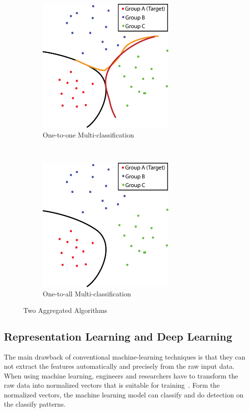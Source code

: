 \begin{spacing}{1.5}
\begin{figure}[th]
    \centering
    \begin{subfigure}[b]{0.49\textwidth}
        \centering
        \includegraphics[width=2.7in, fbox]{Chapter2/1to1.eps}
        \caption{One-to-one Multi-classification}
        \label{fig:121} 
    \end{subfigure}%
    ~
    \begin{subfigure}[b]{0.49\textwidth}
        \centering
        \includegraphics[width=2.7in, fbox]{Chapter2/1toall.eps}
        \caption{One-to-all Multi-classification}
        \label{fig:12all} 
    \end{subfigure}
    \caption{Two Aggregated Algorithms}
\end{figure}


\subsection{Representation Learning and Deep Learning}

The main drawback of conventional machine-learning techniques is that they can not extract the features automatically and precisely from the raw input data. When using machine learning, engineers and researchers have to transform the raw data into normalized vectors that is suitable for training~\cite{ongsulee2017artificial}. Form the normalized vectors, the machine learning model can classify and do detection on the classify patterns.


\end{spacing}
